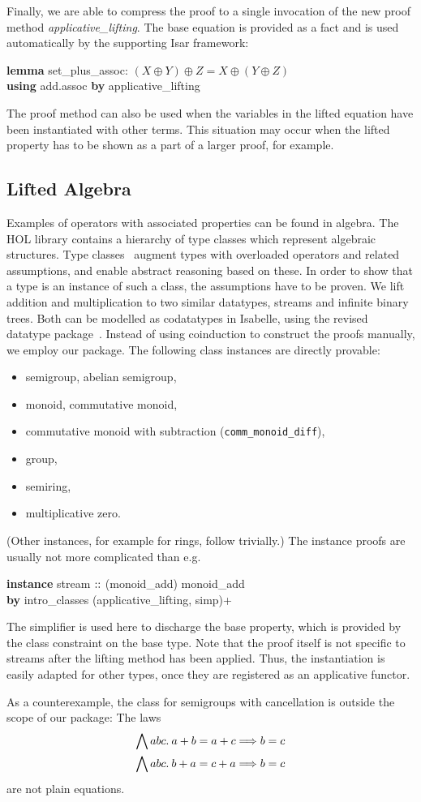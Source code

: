 Finally, we are able to compress the proof to a single invocation of the new
proof method \emph{applicative\_lifting}.
The base equation is provided as a fact and is used automatically by the
supporting Isar framework:
\begin{isabelle}
\textbf{lemma} set\_plus\_assoc: $(X \oplus Y) \oplus Z = X \oplus (Y \oplus Z)$ \\
\textbf{using} add.assoc \textbf{by} applicative\_lifting
\end{isabelle}
The proof method can also be used when the variables in the lifted equation
have been instantiated with other terms.
This situation may occur when the lifted property has to be shown as a part of
a larger proof, for example.


\subsection{Lifted Algebra}\label{subsec:lifted-algebra}

Examples of operators with associated properties can be found in algebra.
The HOL library contains a hierarchy of type classes which represent algebraic
structures.
Type classes~\cite{haftmann07} augment types with overloaded operators and
related assumptions, and enable abstract reasoning based on these.
In order to show that a type is an instance of such a class, the assumptions
have to be proven.
We lift addition and multiplication to two similar datatypes, streams and
infinite binary trees.
Both can be modelled as codatatypes in Isabelle, using the revised datatype
package~\cite{blanchette14}.
Instead of using coinduction to construct the proofs manually, we employ
our package.
The following class instances are directly provable:
\begin{itemize}
\item semigroup, abelian semigroup,
\item monoid, commutative monoid,
\item commutative monoid with subtraction (\texttt{comm\_monoid\_diff}),
\item group,
\item semiring,
\item multiplicative zero.
\end{itemize}
(Other instances, for example for rings, follow trivially.)
The instance proofs are usually not more complicated than e.g.
\begin{isabelle}
\textbf{instance} stream $\mathrel{::}$ (monoid\_add) monoid\_add \\
\textbf{by} intro\_classes (applicative\_lifting, simp)+
\end{isabelle}
The simplifier is used here to discharge the base property, which is provided
by the class constraint on the base type.
Note that the proof itself is not specific to streams after the lifting
method has been applied.
Thus, the instantiation is easily adapted for other types, once they are
registered as an applicative functor.

As a counterexample, the class for semigroups with cancellation is outside the
scope of our package: The laws
\begin{align*}
\bigwedge a b c.\>a + b &= a + c \Longrightarrow b = c \\
\bigwedge a b c.\>b + a &= c + a \Longrightarrow b = c
\end{align*}
are not plain equations.
